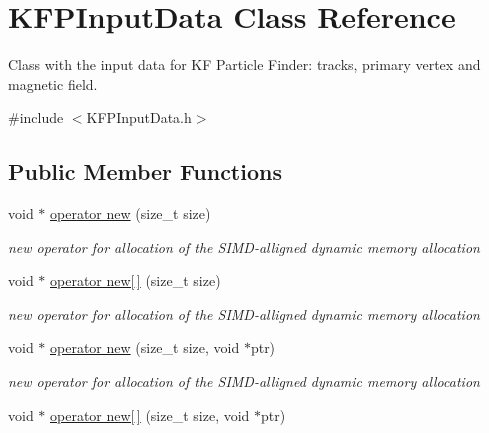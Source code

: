 \hypertarget{classKFPInputData}{}\section{K\+F\+P\+Input\+Data Class Reference}
\label{classKFPInputData}


Class with the input data for KF Particle Finder\+: tracks, primary vertex and magnetic field.  




{\ttfamily \#include $<$K\+F\+P\+Input\+Data.\+h$>$}

\subsection*{Public Member Functions}
\begin{DoxyCompactItemize}
\item 
void $\ast$ \hyperlink{classKFPInputData_aa9543d6b67cf850c34a43a901b8ba012}{operator new} (size\+\_\+t size)\hypertarget{classKFPInputData_aa9543d6b67cf850c34a43a901b8ba012}{}\label{classKFPInputData_aa9543d6b67cf850c34a43a901b8ba012}

\begin{DoxyCompactList}\small\item\em new operator for allocation of the S\+I\+M\+D-\/alligned dynamic memory allocation \end{DoxyCompactList}\item 
void $\ast$ \hyperlink{classKFPInputData_a78146adb973bcdf3f99299af141d8511}{operator new\mbox{[}$\,$\mbox{]}} (size\+\_\+t size)\hypertarget{classKFPInputData_a78146adb973bcdf3f99299af141d8511}{}\label{classKFPInputData_a78146adb973bcdf3f99299af141d8511}

\begin{DoxyCompactList}\small\item\em new operator for allocation of the S\+I\+M\+D-\/alligned dynamic memory allocation \end{DoxyCompactList}\item 
void $\ast$ \hyperlink{classKFPInputData_a9f8eca94cdbd5e7a8259b0eda9e8a6d2}{operator new} (size\+\_\+t size, void $\ast$ptr)\hypertarget{classKFPInputData_a9f8eca94cdbd5e7a8259b0eda9e8a6d2}{}\label{classKFPInputData_a9f8eca94cdbd5e7a8259b0eda9e8a6d2}

\begin{DoxyCompactList}\small\item\em new operator for allocation of the S\+I\+M\+D-\/alligned dynamic memory allocation \end{DoxyCompactList}\item 
void $\ast$ \hyperlink{classKFPInputData_a35531b4fef57302c2e276d707a438c50}{operator new\mbox{[}$\,$\mbox{]}} (size\+\_\+t size, void $\ast$ptr)\hypertarget{classKFPInputData_a35531b4fef57302c2e276d707a438c50}{}\label{classKFPInputData_a35531b4fef57302c2e276d707a438c50}


\end{DoxyCompactItemize}
